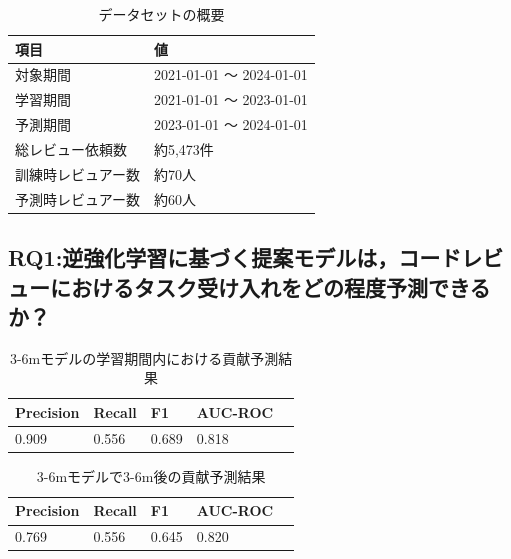 \documentclass[submit,techrep,noauthor]{ipsj}
\begin{document}
\begin{table}[h]
    \centering
    \caption{データセットの概要}
    \begin{tabularx}{\columnwidth}{XX}
        \hline
        項目 & 値 \\
        \hline
        対象期間 & 2021-01-01 ～ 2024-01-01 \\
        学習期間 & 2021-01-01 ～ 2023-01-01 \\
        予測期間 & 2023-01-01 ～ 2024-01-01 \\
        \hline
        総レビュー依頼数 & 約5,473件 \\
        訓練時レビュアー数 & 約70人 \\
        予測時レビュアー数 & 約60人 \\ 
        \hline
    \end{tabularx}
    \label{table:dataset}
\end{table}


\subsection{RQ1:逆強化学習に基づく提案モデルは，コードレビューにおけるタスク受け入れをどの程度予測できるか？}

\begin{table}[h]
    \label{table:train}
    \centering
    \caption{3-6mモデルの学習期間内における貢献予測結果}
    \begin{tabularx}{\columnwidth}{XXXXX}
        \hline
       Precision & Recall & F1 & AUC-ROC \\
       \hline
       0.909  & 0.556 & 0.689 & 0.818 \\ 
       \hline
    \end{tabularx}
\end{table}

\begin{table}[h]
    \label{table:predict}
    \centering
    \caption{3-6mモデルで3-6m後の貢献予測結果}
    \begin{tabularx}{\columnwidth}{XXXXX}
        \hline
       Precision & Recall & F1 & AUC-ROC \\
       \hline
       0.769  & 0.556 & 0.645 & 0.820 \\ 
       \hline
    \end{tabularx}
\end{table}
\end{document}
